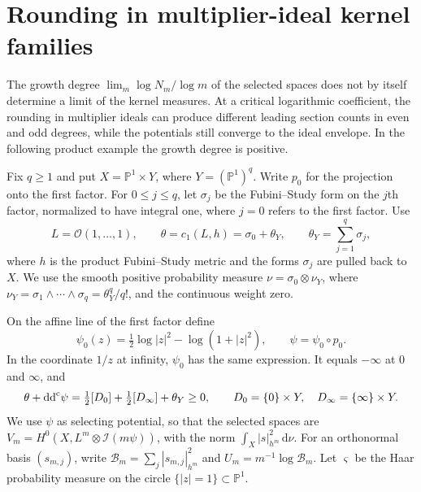 \section{Rounding in multiplier-ideal kernel families}
\label{sec:ideal-rounding-kernels}

The growth degree $\lim_m\log N_m/\log m$ of the selected spaces does not by itself determine a limit of the kernel measures. At a critical logarithmic coefficient, the rounding in multiplier ideals can produce different leading section counts in even and odd degrees, while the potentials still converge to the ideal envelope. In the following product example the growth degree is positive.

Fix $q\geq1$ and put $X=\mathbb P^1\times Y$, where
$Y=(\mathbb P^1)^q$. Write $p_0$ for the projection onto the first factor.
For $0\leq j\leq q$, let $\sigma_j$ be the Fubini--Study form on the $j$th factor, normalized to have integral one, where $j=0$ refers to the first factor. Use
\[
 L=\mathcal O(1,\ldots,1),\qquad
 \theta=c_1(L,h)=\sigma_0+\theta_Y,\qquad
 \theta_Y=\sum_{j=1}^q\sigma_j,
\]
where $h$ is the product Fubini--Study metric and the forms $\sigma_j$ are pulled back to $X$. We use the smooth positive probability measure
$\nu=\sigma_0\otimes\nu_Y$, where
$\nu_Y=\sigma_1\wedge\cdots\wedge\sigma_q=\theta_Y^q/q!$, and the continuous weight zero.

On the affine line of the first factor define
\[
 \psi_0(z)=\tfrac12\log|z|^2-\log(1+|z|^2),\qquad
 \psi=\psi_0\circ p_0.
\]
In the coordinate $1/z$ at infinity, $\psi_0$ has the same expression. It equals $-\infty$ at $0$ and $\infty$, and
\begin{equation}\label{eq:critical-selector-curvature}
 \theta+\mathrm{dd}^{\mathrm{c}}\psi=\tfrac12[D_0]+\tfrac12[D_\infty]+\theta_Y\geq0,
 \qquad D_0=\{0\}\times Y,\quad D_\infty=\{\infty\}\times Y.
\end{equation}
We use $\psi$ as selecting potential, so that the selected spaces are $V_m=H^0(X,L^m\otimes\mathcal I(m\psi))$, with the norm $\int_X|s|_{h^m}^2\,\mathrm d\nu$. For an orthonormal basis $(s_{m,j})$, write
$\mathcal B_m=\sum_j|s_{m,j}|_{h^m}^2$ and
$U_m=m^{-1}\log\mathcal B_m$. Let $\varsigma$
be the Haar probability measure on the circle $\{|z|=1\}\subset\mathbb P^1$.

